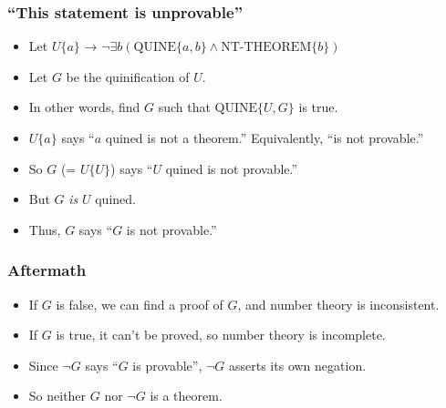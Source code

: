 \documentclass[mathserif]{beamer}
\begin{document}
\begin{frame}
\frametitle{``This statement is unprovable''}
\label{sec-5-3}

\pause
\begin{itemize}

\item Let $U\{a\}$ → $¬∃b (\text{QUINE}\{a,b\} ∧ \text{NT-THEOREM}\{b\})$ \pause\\
\label{sec-5-3-1}%
\item Let $G$ be the quinification of $U$.\pause\\
\label{sec-5-3-2}%
\item In other words, find $G$ such that $\text{QUINE}\{U,G\}$ is true.\pause\\
\label{sec-5-3-3}%
\item $U\{a\}$ says ``$a$ quined is not a theorem.'' Equivalently, ``is not provable.''\pause\\
\label{sec-5-3-4}%
\item So $G$ (= $U\{U\}$) says ``$U$ quined is not provable.''\pause\\
\label{sec-5-3-5}%
\item But $G$ \emph{is} $U$ quined.\pause\\
\label{sec-5-3-6}%
\item Thus, $G$ says ``$G$ is not provable.''\\
\label{sec-5-3-7}%
\end{itemize} %
\end{frame}
\begin{frame}
\frametitle{Aftermath}
\label{sec-5-4}

\pause
\begin{itemize}

\item If $G$ is false, we can find a proof of $G$, and number theory is inconsistent.\pause\\
\label{sec-5-4-1}%
\item If $G$ is true, it can't be proved, so number theory is incomplete.\pause\\
\label{sec-5-4-2}%
\item Since $¬G$ says ``$G$ is provable'', $¬G$ asserts its own negation.\pause\\
\label{sec-5-4-3}%
\item So neither $G$ nor $¬G$ is a theorem.\\
\label{sec-5-4-4}%
\end{itemize} %
\end{frame}
\end{document}
